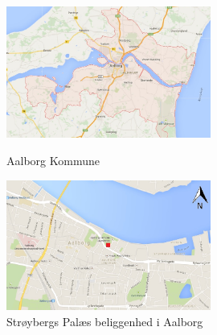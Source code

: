\begin{figure}[htbp] \centering
	\begin{minipage}[b]{0.48\textwidth}\centering
		\includegraphics[width=0.6\textwidth]{billeder/aalborgkommune.png}
		\caption{Aalborg Kommune}
		\label{fig:aalborgkommune}
	\end{minipage}\hfill
	\begin{minipage}[b]{0.48\textwidth}\centering
		\centering
		\includegraphics[width=0.6\textwidth]{billeder/aalborg.png}
		\caption{Strøybergs Palæs beliggenhed i Aalborg}
		\label{fig:aalborg}
	\end{minipage}
\end{figure}